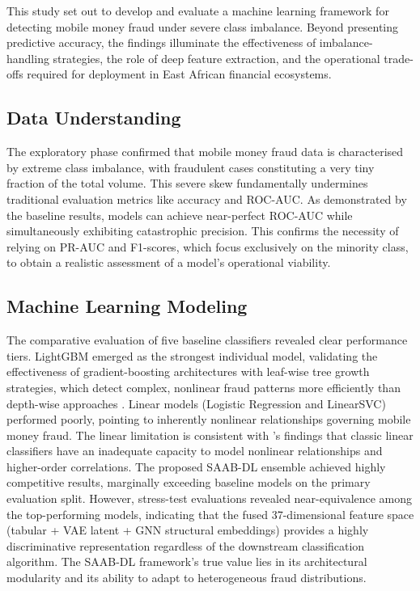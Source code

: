 \documentclass[a4paper,fleqn]{cas-sc}
\begin{document}
This study set out to develop and evaluate a machine learning framework for detecting mobile money fraud under severe class imbalance. Beyond presenting predictive accuracy, the findings illuminate the effectiveness of imbalance-handling strategies, the role of deep feature extraction, and the operational trade-offs required for deployment in East African financial ecosystems.

\subsection{Data Understanding}
The exploratory phase confirmed that mobile money fraud data is characterised by extreme class imbalance, with fraudulent cases constituting a very tiny fraction of the total volume. This severe skew fundamentally undermines traditional evaluation metrics like accuracy and ROC-AUC. As demonstrated by the baseline results, models can achieve near-perfect ROC-AUC while simultaneously exhibiting catastrophic precision. This confirms the necessity of relying on PR-AUC and F1-scores, which focus exclusively on the minority class, to obtain a realistic assessment of a model's operational viability.

\subsection{Machine Learning Modeling}
The comparative evaluation of five baseline classifiers revealed clear performance tiers. LightGBM emerged as the strongest individual model, validating the effectiveness of gradient-boosting architectures with leaf-wise tree growth strategies, which detect complex, nonlinear fraud patterns more efficiently than depth-wise approaches \cite{ Peng2023LGBMDF}. Linear models (Logistic Regression and LinearSVC) performed poorly, pointing to inherently nonlinear relationships governing mobile money fraud. The linear limitation is consistent with \cite{Hu2026SRAF}'s findings that classic linear classifiers have an inadequate capacity to model nonlinear relationships and higher-order correlations. The proposed SAAB-DL ensemble achieved highly competitive results, marginally exceeding baseline models on the primary evaluation split. However, stress-test evaluations revealed near-equivalence among the top-performing models, indicating that the fused 37-dimensional feature space (tabular + VAE latent + GNN structural embeddings) provides a highly discriminative representation regardless of the downstream classification algorithm. The SAAB-DL framework's true value lies in its architectural modularity and its ability to adapt to heterogeneous fraud distributions.
\end{document}
